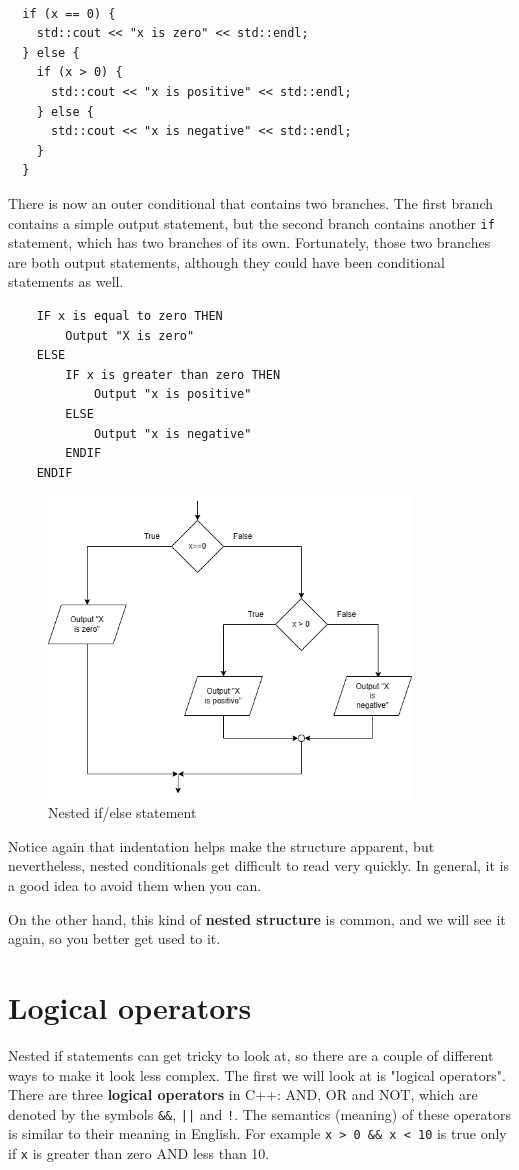 \begin{lstlisting}
  
  if (x == 0) {
    std::cout << "x is zero" << std::endl;
  } else {
    if (x > 0) {
      std::cout << "x is positive" << std::endl;
    } else {
      std::cout << "x is negative" << std::endl;
    }
  }
\end{lstlisting}
%
There is now an outer conditional that contains two branches.  The
first branch contains a simple output statement, but the second
branch contains another {\tt if} statement, which has two branches
of its own.  Fortunately, those two branches are both output
statements, although they could have been conditional statements as
well.
\begin{verbatim}
    IF x is equal to zero THEN
        Output "X is zero"
    ELSE 
        IF x is greater than zero THEN
            Output "x is positive"
        ELSE 
            Output "x is negative"
        ENDIF
    ENDIF
\end{verbatim}
\begin{figure}[h]
    \centering
    \includegraphics[height=8cm]{images/nestedifflow.png}
    \caption{Nested if/else statement}
    \label{fig:nestedifelse}
\end{figure}
Notice again that indentation helps make the structure
apparent, but nevertheless, nested conditionals get difficult to read
very quickly.  In general, it is a good idea to avoid them when you
can.


On the other hand, this kind of {\bf nested structure} is common, and
we will see it again, so you better get used to it.

\section{Logical operators}
Nested if statements can get tricky to look at, so there are a couple of different ways to make it look less complex. The first we will look at is "logical operators".
There are three {\bf logical operators} in C++: AND, OR and NOT,
which are denoted by the symbols {\tt \&\&}, {\tt ||} and
{\tt !}.  The semantics (meaning) of these operators is similar
to their meaning in English.  For example {\tt x > 0 \&\& x < 10}
is true only if {\tt x} is greater than zero AND less than 10.

